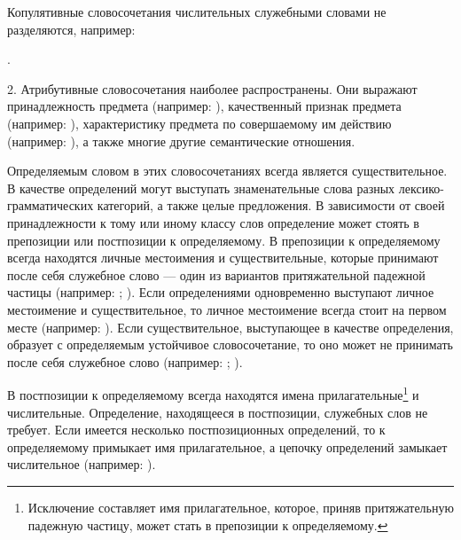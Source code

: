 Копулятивные словосочетания числительных служебными словами не разделяются, например:
\begin{prfsample}
	\item {}.
\end{prfsample}

2. Атрибутивные словосочетания наиболее распространены. Они выражают принадлежность предмета (например: ),
качественный признак предмета (например: ),
характеристику предмета по совершаемому им действию (например: ), а также многие другие семантические отношения.

Определяемым словом в этих словосочетаниях всегда является существительное. В качестве определений могут выступать знаменательные слова разных лексико-грамматических категорий, а также целые предложения. В зависимости от своей принадлежности к тому или иному классу слов определение может стоять в препозиции или постпозиции к определяемому. В препозиции к определяемому всегда находятся личные местоимения и существительные, которые принимают после себя служебное слово --- один из вариантов притяжательной падежной частицы (например:
;
). Если определениями одновременно выступают личное местоимение и существительное, то личное местоимение всегда стоит на первом месте (например:
). Если существительное, выступающее в качестве определения, образует с определяемым устойчивое словосочетание, то оно может не принимать после себя служебное слово (например:
;
).

В постпозиции к определяемому всегда находятся имена прилагательные\footnote[52]{Исключение составляет имя прилагательное, которое, приняв притяжательную падежную частицу, может стать в препозиции к определяемому.} и числительные. Определение, находящееся в постпозиции, служебных слов не требует. Если имеется несколько постпозиционных определений, то к определяемому примыкает имя прилагательное, а цепочку определений замыкает числительное (например: ).


